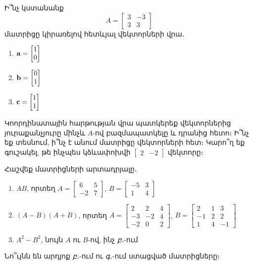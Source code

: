 \begin{problem}
Ի՞նչ կստանանք
\[
A = \begin{bmatrix}
    3 & -3 \\
    3 & 3
\end{bmatrix}
\] 
մատրիցը կիրառելով հետևյալ վեկտորների վրա․
\begin{enumerate}[label={\alph*}․]
\item $\mathbf{a}=\begin{bmatrix}
    1 \\ 0
\end{bmatrix}$

\item $\mathbf{b}=\begin{bmatrix}
    0 \\ 1
\end{bmatrix}$

\item $\mathbf{c}=\begin{bmatrix}
    1 \\ 1
\end{bmatrix}$
\end{enumerate}

Կոորդինատային հարթության վրա պատկերեք վեկտորներից յուրաքան\-չ\-յու\-րը մինչև $A$-ով բազմապատկելը և դրանից հետո։ Ի՞նչ եք տեսնում, ի՞նչ է անում մատրիցը վեկտորների հետ։ Կարո՞ղ եք գուշակել, թե ինչպես կձևափոխվի $\begin{bmatrix}
    2 & -2
\end{bmatrix}$ վեկտորը։
\end{problem}

\begin{problem}
Հաշվեք մատրիցների արտադրյալը․
\begin{enumerate}[label={\alph*}․]
\item $AB$, որտեղ $A=\begin{bmatrix}
6&5\\-2&7  \end{bmatrix}$, $B=\begin{bmatrix}
-5&3\\1&4   \end{bmatrix}$

\item $(A-B)(A+B)$, որտեղ $A=\begin{bmatrix}
2&2&4\\-3&-2&4\\-2&0&2   \end{bmatrix}$, $B=\begin{bmatrix}
2&1&3\\-1&2&2\\1&4&-1   \end{bmatrix}$

\item $A^2 - B^2$, նույն $A$ ու $B$-ով, ինչ \textit{բ․}-ում
\end{enumerate}

Նո՞ւյնն են արդյոք \textit{բ․}-ում ու \textit{գ․}-ում ստացված մատրիցները։
\end{problem}


